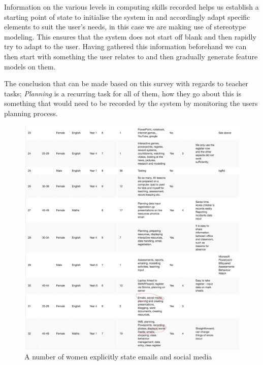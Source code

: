 Information on the various levels in computing skills recorded helps us establish a starting point of state to initialise the system in and accordingly adapt specific elements to suit the user's needs, in this case we are making use of stereotype modeling. This ensures that the system does not start off blank and then rapidly try to adapt to the user. Having gathered this information beforehand we can then start with something the user relates to and then gradually generate feature models on them.

The conclusion that can be made based on this survey with regards to teacher tasks; \emph{Planning} is a recurring task for all of them, how they go about this is something that would need to be recorded by the system by monitoring the users planning process. 
\begin{figure}[!ht]
    \caption{A number of women explicitly state emails and social media}
    \label{fig:Social}
    \centering
    \includegraphics[scale=0.3]{figures/women_stat}
\end{figure}
